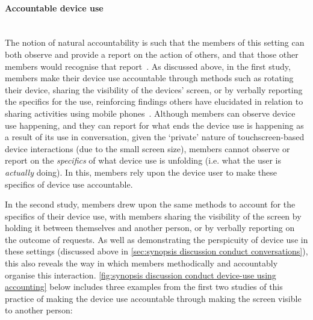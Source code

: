 \begin{revisedsubmission}
\paragraph{Accountable device use} \hfill \\
The notion of natural accountability is such that the members of this setting can both observe and provide a report on the action of others, and that those other members would recognise that report~\citep[pp. 1--34, see~\ref{line:naturalaccountability}]{Garfinkel1967}.
As discussed above, in the first study, members make their device use accountable through methods such as rotating their device, sharing the visibility of the devices' screen, or by verbally reporting the specifics for the use, reinforcing findings others have elucidated in relation to sharing activities using mobile phones~\citep{Raclaw2016}.
Although members can observe device use happening, and they can report for what ends the device use is happening as a result of its use in conversation, given the `private' nature of touchscreen-based device interactions (due to the small screen size), members cannot observe or report on the \textit{specifics} of what device use is unfolding (i.e. what the user is \textit{actually} doing).
In this, members rely upon the device user to make these specifics of device use accountable.

In the second study, members drew upon the same methods to account for the specifics of their device use, with members sharing the visibility of the screen by holding it between themselves and another person, or by verbally reporting on the outcome of requests.
As well as demonstrating the perspicuity of device use in these settings (discussed above in \ref{sec:synopsis discussion conduct conversations}), this also reveals the way in which members methodically and accountably organise this interaction.
\autoref{fig:synopsis discussion conduct device-use using accounting} below includes three examples from the first two studies of this practice of making the device use accountable through making the screen visible to another person:


\end{revisedsubmission}
